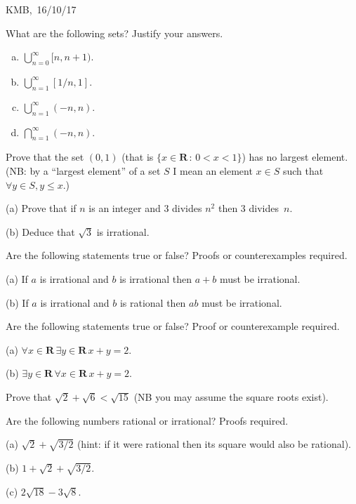 \documentclass[10pt]{article}
\newcommand{\R}{\mathbf{R}}
\begin{document}
\begin{flushright} KMB,\ 16/10/17\end{flushright}


\medskip
{} What are the following sets? Justify your answers.
\begin{enumerate}[(a)]
\item $\bigcup_{n=0}^\infty[n,n+1)$.
\item $\bigcup_{n=1}^\infty[1/n,1]$.
\item $\bigcup_{n=1}^\infty(-n,n)$.
\item $\bigcap_{n=1}^\infty(-n,n)$.
\end{enumerate}
\medskip
{} Prove that the set $(0,1)$ (that is $\{x\in\R\,:\,0<x<1\}$) has no largest element. (NB: by a ``largest element'' of a set $S$ I mean an element $x\in S$ such that $\forall y\in S, y\leq x$.)

\medskip{} 

(a) Prove that if $n$ is an integer and $3$ divides $n^2$ then $3$ divides~$n$.

(b) Deduce that $\sqrt{3}$ is irrational.

\medskip{} Are the following statements true or false? Proofs or counterexamples required.

(a) If $a$ is irrational and $b$ is irrational then $a+b$ must be irrational.

(b) If $a$ is irrational and $b$ is rational then $ab$ must be irrational.

\medskip{} Are the following statements true or false? Proof or counterexample required.

(a) $\forall x\in\R\,\exists y\in\R\,x+y=2.$

(b) $\exists y\in\R\,\forall x\in\R\,x+y=2.$

\medskip{} Prove that $\sqrt{2}+\sqrt{6}<\sqrt{15}$ (NB you may assume the square roots exist).

\medskip{} Are the following numbers rational or irrational? Proofs required.

(a) $\sqrt{2}+\sqrt{3/2}$ (hint: if it were rational then its square would also be rational).

(b) $1+\sqrt{2}+\sqrt{3/2}$.

(c) $2\sqrt{18}-3\sqrt{8}$.
\end{document}
